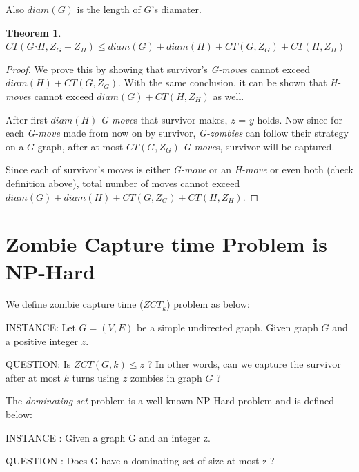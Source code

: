 \documentclass[1p]{elsarticle}
\newtheorem{theorem}{Theorem}
\begin{document}
	Also $diam(G)$ is the length of $G$'s diamater.
	\begin{theorem}
		\label{T5}
		$CT( G \square H, Z_G + Z_H ) \leq diam(G) + diam(H) + CT(G, Z_G) + CT(H, Z_H)$
	\end{theorem}
	\begin{proof}
		We prove this by showing that survivor's {\it G-move}s cannot exceed $diam(H) + CT(G, Z_G)$. With the same
		conclusion, it can be shown that {\it H-move}s cannot exceed $diam(G) + CT(H, Z_H)$ as well.

		After first $diam(H)$ {\it G-move}s that survivor makes, $z$ = $y$ holds. Now since for each {\it G-move} made
		from now on by survivor, {\it G-zombies} can follow their strategy on a $G$ graph, after at most $CT(G,Z_G)$
		{\it G-move}s, survivor will be captured. 
		
		Since each of survivor's moves is either {\it G-move} or an {\it H-move} or even both (check definition above),
		total number of moves cannot exceed $diam(G) + diam(H) + CT(G, Z_G) + CT(H, Z_H)$.
	\end{proof}
\section{Zombie Capture time Problem is NP-Hard}\label{np-capturetime}
	We define zombie capture time ($ZCT_k$) problem as below:


	INSTANCE: Let $G = (V,E)$ be a simple undirected graph. Given graph $G$ and a positive integer $z$.


	QUESTION: Is $ZCT(G,k) \leq z$ ? In other words, can we capture the survivor after at most $k$ turns using $z$ zombies in graph $G$ ?

	The {\it dominating set} problem is a well-known NP-Hard problem and is defined below:

	INSTANCE : Given a graph G and an integer z.

	QUESTION : Does G have a dominating set of size at most z ?
\end{document}
